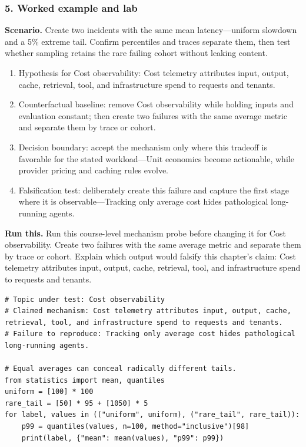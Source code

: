 \subsubsection*{5. Worked example and lab}
\textbf{Scenario.} Create two incidents with the same mean latency—uniform slowdown and a 5\% extreme tail. Confirm percentiles and traces separate them, then test whether sampling retains the rare failing cohort without leaking content.
\begin{enumerate}
\item Hypothesis for Cost observability: Cost telemetry attributes input, output, cache, retrieval, tool, and infrastructure spend to requests and tenants.
\item Counterfactual baseline: remove Cost observability while holding inputs and evaluation constant; then create two failures with the same average metric and separate them by trace or cohort.
\item Decision boundary: accept the mechanism only where this tradeoff is favorable for the stated workload—Unit economics become actionable, while provider pricing and caching rules evolve.
\item Falsification test: deliberately create this failure and capture the first stage where it is observable—Tracking only average cost hides pathological long-running agents.
\end{enumerate}
\textbf{Run this.} Run this course-level mechanism probe before changing it for Cost observability. Create two failures with the same average metric and separate them by trace or cohort. Explain which output would falsify this chapter's claim: Cost telemetry attributes input, output, cache, retrieval, tool, and infrastructure spend to requests and tenants.
\begin{Verbatim}[fontsize=\scriptsize]
# Topic under test: Cost observability
# Claimed mechanism: Cost telemetry attributes input, output, cache, retrieval, tool, and infrastructure spend to requests and tenants.
# Failure to reproduce: Tracking only average cost hides pathological long-running agents.

# Equal averages can conceal radically different tails.
from statistics import mean, quantiles
uniform = [100] * 100
rare_tail = [50] * 95 + [1050] * 5
for label, values in (("uniform", uniform), ("rare_tail", rare_tail)):
    p99 = quantiles(values, n=100, method="inclusive")[98]
    print(label, {"mean": mean(values), "p99": p99})
\end{Verbatim}
